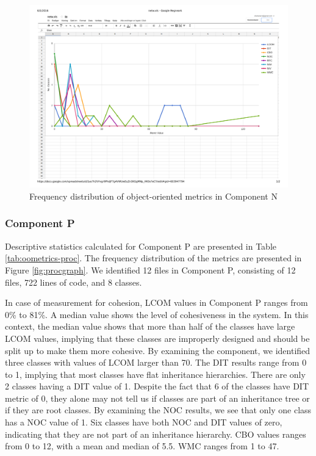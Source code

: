 \begin{landscape}
\setlength\LTleft{-.5in}
	\begin{figure}
	\centering
	\includegraphics[width=\textwidth]{images/pdf/network.pdf}
	\caption{Frequency distribution of object-oriented metrics in Component N}
	\label{fig:netgraph}
	\end{figure}
\end{landscape}



\subsubsection{Component P}
Descriptive statistics calculated for Component P are presented in Table \ref{tab:oometrics-proc}. The frequency distribution of the metrics are presented in Figure \ref{fig:procgraph}. We identified 12 files in Component P, consisting of 12 files, 722 lines of code, and 8 classes.

In case of measurement for cohesion, LCOM values in Component P ranges from 0\% to 81\%. A median value shows the level of cohesiveness in the system. In this context, the median value shows that more than half of the classes have large LCOM values, implying that these classes are improperly designed and should be split up to make them more cohesive. By examining the component, we identified three classes with values of LCOM larger than 70. The DIT results range from 0 to 1, implying that most classes have flat inheritance hierarchies. There are only 2 classes having a DIT value of 1. Despite the fact that 6 of the classes have DIT metric of 0, they alone may not tell us if classes are part of an inheritance tree or if they are root classes. By examining the NOC results, we see that only one class has a NOC value of 1. Six classes have both NOC and DIT values of zero, indicating that they are not part of an inheritance hierarchy. CBO values ranges from 0 to 12, with a mean and median of 5.5. WMC ranges from 1 to 47. 


